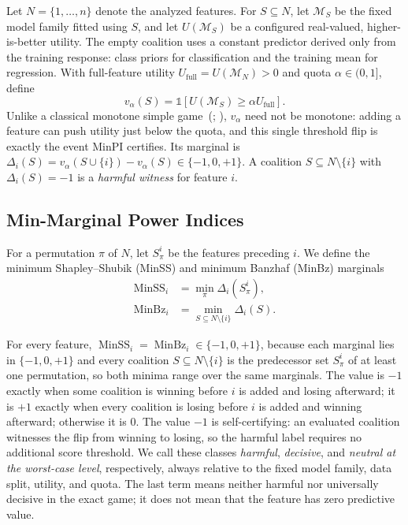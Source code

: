 \documentclass{article}
\begin{document}
Let $N=\{1,\ldots,n\}$ denote the analyzed features. For $S\subseteq N$, let $\mathcal{M}_S$ be the fixed model family fitted using $S$, and let $U(\mathcal{M}_S)$ be a configured real-valued, higher-is-better utility. The empty coalition uses a constant predictor derived only from the training response: class priors for classification and the training mean for regression. With full-feature utility $U_{\mathrm{full}}=U(\mathcal{M}_N)>0$ and quota $\alpha\in(0,1]$, define
\begin{equation}
v_\alpha(S)=\mathbb{1}\!\left[U(\mathcal{M}_S)\geq \alpha U_{\mathrm{full}}\right].
\label{eq:utvg}
\end{equation}
Unlike a classical monotone simple game~(\citealp{owen1972multilinear}; \citealp{straffin1988shapley}), $v_\alpha$ need not be monotone: adding a feature can push utility just below the quota, and this single threshold flip is exactly the event MinPI certifies. Its marginal is
$\Delta_i(S)=v_\alpha(S\cup\{i\})-v_\alpha(S)\in\{-1,0,+1\}$. A coalition $S\subseteq N\setminus\{i\}$ with $\Delta_i(S)=-1$ is a \emph{harmful witness} for feature $i$.

\subsection{Min-Marginal Power Indices}

For a permutation $\pi$ of $N$, let $S_\pi^i$ be the features preceding $i$. We define the minimum Shapley--Shubik (MinSS) and minimum Banzhaf (MinBz) marginals
\begin{align}
\operatorname{MinSS}_i &= \min_{\pi}\Delta_i(S_\pi^i), \\
\operatorname{MinBz}_i &= \min_{S\subseteq N\setminus\{i\}}\Delta_i(S).
\end{align}

For every feature, $\operatorname{MinSS}_i=\operatorname{MinBz}_i\in\{-1,0,+1\}$, because each marginal lies in $\{-1,0,+1\}$ and every coalition $S\subseteq N\setminus\{i\}$ is the predecessor set $S_\pi^i$ of at least one permutation, so both minima range over the same marginals. The value is $-1$ exactly when some coalition is winning before $i$ is added and losing afterward; it is $+1$ exactly when every coalition is losing before $i$ is added and winning afterward; otherwise it is $0$. The value $-1$ is self-certifying: an evaluated coalition witnesses the flip from winning to losing, so the harmful label requires no additional score threshold. We call these classes \emph{harmful}, \emph{decisive}, and \emph{neutral at the worst-case level}, respectively, always relative to the fixed model family, data split, utility, and quota. The last term means neither harmful nor universally decisive in the exact game; it does not mean that the feature has zero predictive value.
\end{document}
